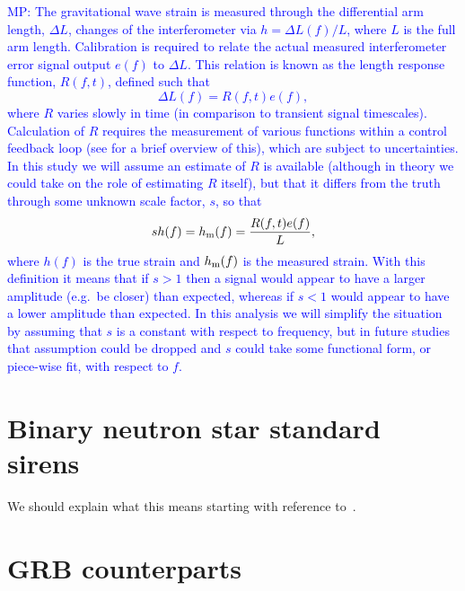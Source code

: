 \documentclass[10pt]{iopart}
\newcommand{\MP}[1]{\textcolor{blue}{MP: #1}}
\begin{document}
\MP{The gravitational wave strain is measured through the differential arm length, $\Delta L$, 
changes of the interferometer via $h = \Delta L(f) / L$, where $L$ is the full arm length.
Calibration is required to relate the actual measured interferometer error signal output
$e(f)$ to $\Delta L$. This relation is known as the length response function, $R(f,t)$,
defined such that
\begin{equation}
\Delta L(f) = R(f,t) e(f),
\end{equation}
where $R$ varies slowly in time (in comparison to transient signal timescales).
Calculation of $R$ requires the measurement of various functions within a control feedback loop
(see \cite{Vitale:2012} for a brief overview of this), which are subject to
uncertainties. In this study we will assume an estimate of $R$ is available (although
in theory we could take on the role of estimating $R$ itself), but that it differs from the
truth through some unknown scale factor, $s$, so that
\begin{equation}
sh(f) = h_{\rm m}(f) = \frac{R(f,t) e(f)}{L},
\end{equation}
where $h(f)$ is the true strain and $h_{\rm m}(f)$ is the measured strain. With this definition it
means that if $s > 1$ then a signal would appear to have a larger amplitude (e.g.\ be closer) than 
expected, whereas if $s < 1$ would appear to have a lower amplitude than expected. In this analysis 
we will simplify the situation by assuming that $s$ is a constant with respect to frequency, but in 
future studies that assumption could be dropped and $s$ could take some functional form, or 
piece-wise fit, with respect to $f$.}

\section{Binary neutron star standard sirens\label{sec:sirens}}

We should explain what this means starting with reference
to~\cite{1986Natur.323..310S}.

\section{GRB counterparts\label{sec:GRB}}
\end{document}
